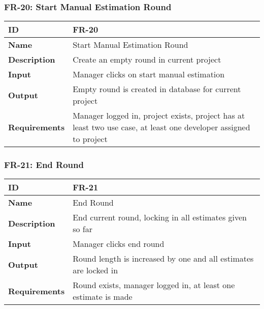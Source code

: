 \subsubsection{FR-20: Start Manual Estimation Round}
\begin{center}
  \begin{tabularx}{\textwidth}{|l|X|}
      \hline
      \textbf{ID} & FR-20 \\
      \hline
      \textbf{Name} & Start Manual Estimation Round \\
      \hline
      \textbf{Description} & Create an empty round in current project \\
      \hline
      \textbf{Input} & Manager clicks on start manual estimation \\
      \hline
      \textbf{Output} & Empty round is created in database for current project \\
      \hline
      \textbf{Requirements} & Manager logged in, project exists, project has at least two use case, at least one developer assigned to project \\
      \hline
  \end{tabularx}
\end{center}

\subsubsection{FR-21: End Round}
\begin{center}
  \begin{tabularx}{\textwidth}{|l|X|}
      \hline
      \textbf{ID} & FR-21 \\
      \hline
      \textbf{Name} & End Round \\
      \hline
      \textbf{Description} & End current round, locking in all estimates given so far \\
      \hline
      \textbf{Input} & Manager clicks end round \\
      \hline
      \textbf{Output} & Round length is increased by one and all estimates are locked in \\
      \hline
      \textbf{Requirements} & Round exists, manager logged in, at least one estimate is made \\
      \hline
  \end{tabularx}
\end{center}

